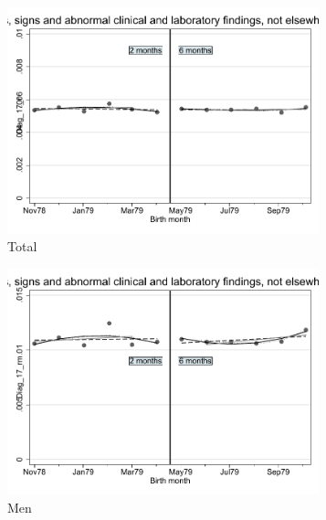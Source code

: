 \documentclass[a4paper ]{article}
\begin{document}
\begin{figure}[h]
	\centering
	\begin{subfigure}[t]{0.31\textwidth}
		\centering
		\includegraphics[width=0.99\textwidth]{R1_RD_Diag_17_r_fits}
		\caption{Total}		
	\end{subfigure}
	\begin{subfigure}[t]{0.31\textwidth}
		\centering
		\includegraphics[width=0.99\textwidth]{R1_RD_Diag_17_rm_fits}
		\caption{Men}		
	\end{subfigure}
	\quad
	\begin{subfigure}[t]{0.31\textwidth}
		\centering

\end{subfigure}
\end{figure}
\end{document}
